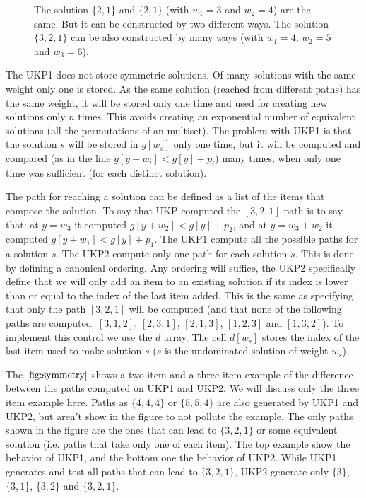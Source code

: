 \documentclass[12pt]{article}
\begin{document}
\begin{figure}
\caption{The solution \(\{2,1\}\) and \(\{2,1\}\) (with \(w_1 = 3\) and \(w_2 = 4\)) are the same. But it can be constructed by two different ways. The solution \(\{3,2,1\}\) can be also constructed by many ways (with \(w_1 = 4\), \(w_2 = 5\) and \(w_3 = 6\)). }
\label{fig:symmetry}
\end{figure}

The UKP1 does not store symmetric solutions. Of many solutions with the same weight only one is stored. As the same solution (reached from different paths) has the same weight, it will be stored only one time and used for creating new solutions only \(n\) times. This avoids creating an exponential number of equivalent solutions (all the permutations of an multiset). The problem with UKP1 is that the solution \(s\) will be stored in \(g[w_s]\) only one time, but it will be computed and compared (as in the line \(g[y + w_i] < g[y] + p_i\)) many times, when only one time was sufficient (for each distinct solution). 

The path for reaching a solution can be defined as a list of the items that compose the solution. To say that UKP computed the \([3,2,1]\) path is to say that: at \(y = w_3\) it computed \(g[y + w_2] < g[y] + p_2\), and at \(y = w_3 + w_2\) it computed \(g[y + w_1] < g[y] + p_1\). The UKP1 compute all the possible paths for a solution \(s\). The UKP2 compute only one path for each solution \(s\). This is done by defining a canonical ordering. Any ordering will suffice, the UKP2 specifically define that we will only add an item to an existing solution if its index is lower than or equal to the index of the last item added. This is the same as specifying that only the path \([3,2,1]\) will be computed (and that none of the following paths are computed: \([3,1,2]\), \([2,3,1]\), \([2,1,3]\), \([1,2,3]\) and \([1,3,2]\)). To implement this control we use the \(d\) array. The cell \(d[w_s]\) stores the index of the last item used to make solution \(s\) (\(s\) is the undominated solution of weight \(w_s\)). 

The \(\autoref{fig:symmetry}\) shows a two item and a three item example of the difference between the paths computed on UKP1 and UKP2. We will discuss only the three item example here. Paths as \(\{4,4,4\}\) or \(\{5,5,4\}\) are also generated by UKP1 and UKP2, but aren't show in the figure to not pollute the example. The only paths shown in the figure are the ones that can lead to \(\{3,2,1\}\) or some equivalent solution (i.e. paths that take only one of each item). The top example show the behavior of UKP1, and the bottom one the behavior of UKP2. While UKP1 generates and test all paths that can lead to \(\{3,2,1\}\), UKP2 generate only \(\{3\}\), \(\{3,1\}\), \(\{3,2\}\) and \(\{3,2,1\}\).
\end{document}
